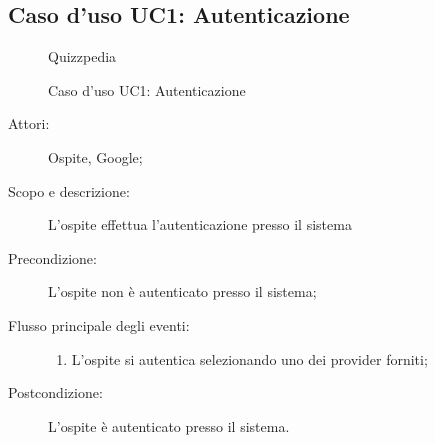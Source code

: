 \hypertarget{UC1}{}
\subsection{Caso d'uso UC1: Autenticazione}
        \begin{figure}[H]
            \centering
            \begin{resizedtikzpicture}{\textwidth}
		\begin{umlsystem}[x=0, fill=lightgray!20]{Quizzpedia}
		\end{umlsystem}
            \end{resizedtikzpicture}
            \caption{Caso d'uso UC1: Autenticazione}
            \label{fig:UC1} 
        \end{figure}
    \begin{description}
\item[Attori:] Ospite, Google;
\item[Scopo e descrizione:] L'ospite effettua l'autenticazione presso il sistema
      \item[Precondizione:] L'ospite non è autenticato presso il sistema;

        \item[Flusso principale degli eventi:] \begin{enumerate}
          \item L'ospite si autentica selezionando uno dei provider forniti;

      \end{enumerate}
    \item[Postcondizione:] L'ospite è autenticato presso il sistema.
  \end{description}
\hypertarget{UC1.1}{}
